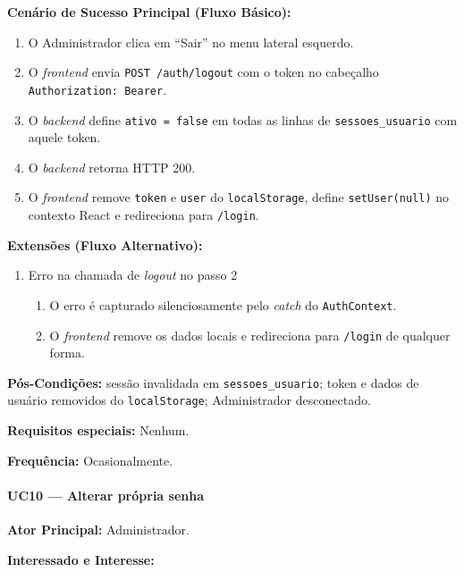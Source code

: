 \textbf{Cenário de Sucesso Principal (Fluxo Básico):}
\begin{enumerate}
  \item O Administrador clica em ``Sair'' no menu lateral esquerdo.
  \item O \textit{frontend} envia
        \texttt{POST /auth/logout} com o token no cabeçalho
        \texttt{Authorization: Bearer}.
  \item O \textit{backend} define \texttt{ativo = false} em
        todas as linhas de \texttt{sessoes\_usuario} com
        aquele token.
  \item O \textit{backend} retorna HTTP 200.
  \item O \textit{frontend} remove \texttt{token} e
        \texttt{user} do \texttt{localStorage}, define
        \texttt{setUser(null)} no contexto React e
        redireciona para \texttt{/login}.
\end{enumerate}

\textbf{Extensões (Fluxo Alternativo):}

\begin{enumerate}
  \renewcommand{\theenumi}{2a}
  \renewcommand{\labelenumi}{\theenumi.}
  \item Erro na chamada de \textit{logout} no passo 2
  \begin{enumerate}
  \item O erro é capturado silenciosamente pelo
        \textit{catch} do \texttt{AuthContext}.
  \item O \textit{frontend} remove os dados locais e
        redireciona para \texttt{/login} de qualquer forma.
  \end{enumerate}
\end{enumerate}

\textbf{Pós-Condições:} sessão invalidada em
\texttt{sessoes\_usuario}; token e dados de usuário removidos
do \texttt{localStorage}; Administrador desconectado.

\textbf{Requisitos especiais:} Nenhum.

\textbf{Frequência:} Ocasionalmente.

\paragraph{UC10 --- Alterar própria senha}\hfill\break

\textbf{Ator Principal:} Administrador.

\textbf{Interessado e Interesse:}

